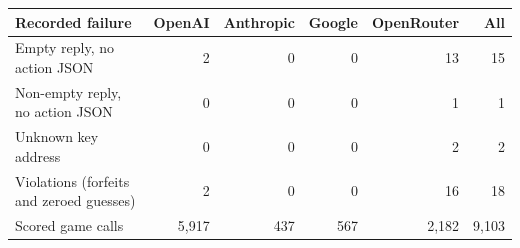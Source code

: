 \begin{tabular}{@{}l r r r r r@{}}
\toprule
Recorded failure & OpenAI & Anthropic & Google & OpenRouter & All \\
\midrule
Empty reply, no action JSON & 2 & 0 & 0 & 13 & 15 \\
Non-empty reply, no action JSON & 0 & 0 & 0 & 1 & 1 \\
Unknown key address & 0 & 0 & 0 & 2 & 2 \\
\midrule
Violations (forfeits and zeroed guesses) & 2 & 0 & 0 & 16 & 18 \\
Scored game calls & 5{,}917 & 437 & 567 & 2{,}182 & 9{,}103 \\
\bottomrule
\end{tabular}
